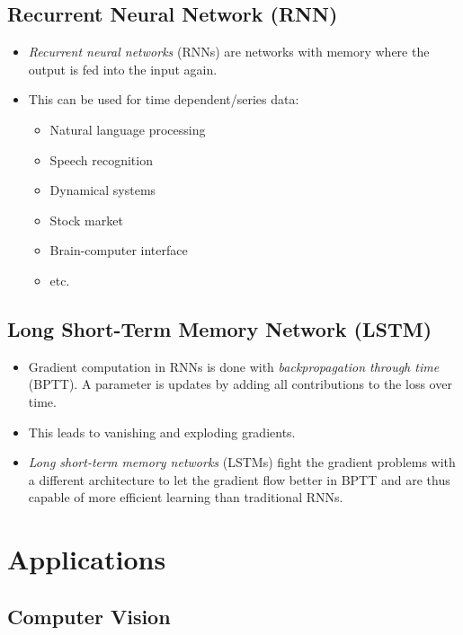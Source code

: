 \documentclass[a4paper, 11pt, accentcolor = tud3b]{tudreport}
\begin{document}
			\subsection{Recurrent Neural Network (RNN)}
				\begin{itemize}
					\item \emph{Recurrent neural networks} (RNNs) are networks with memory where the output is fed into the input again.
					\item This can be used for time dependent/series data:
						\begin{itemize}
							\item Natural language processing
							\item Speech recognition
							\item Dynamical systems
							\item Stock market
							\item Brain-computer interface
							\item etc.
						\end{itemize}
				\end{itemize}

			\subsection{Long Short-Term Memory Network (LSTM)}
				\begin{itemize}
					\item Gradient computation in RNNs is done with \emph{backpropagation through time} (BPTT). A parameter is updates by adding all contributions to the loss over time.
					\item This leads to vanishing and exploding gradients.
					\item \emph{Long short-term memory networks} (LSTMs) fight the gradient problems with a different architecture to let the gradient flow better in BPTT and are thus capable of more efficient learning than traditional RNNs.
				\end{itemize}

		\section{Applications} %

			\subsection{Computer Vision} %
\end{document}
